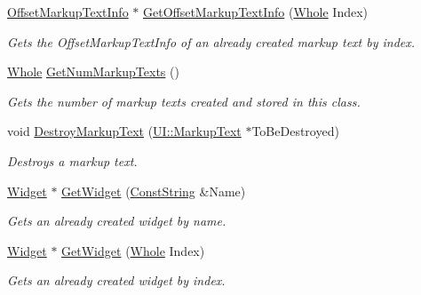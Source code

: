\begin{DoxyCompactItemize}
\hyperlink{structphys_1_1UI_1_1ResizingInfo}{OffsetMarkupTextInfo} $\ast$ \hyperlink{classphys_1_1UI_1_1Window_a05205cbfec7f8824d0d856047307c799}{GetOffsetMarkupTextInfo} (\hyperlink{namespacephys_a460f6bc24c8dd347b05e0366ae34f34a}{Whole} Index)
\begin{DoxyCompactList}\small\item\em Gets the OffsetMarkupTextInfo of an already created markup text by index. \item\end{DoxyCompactList}\item 
\hyperlink{namespacephys_a460f6bc24c8dd347b05e0366ae34f34a}{Whole} \hyperlink{classphys_1_1UI_1_1Window_ac9e23e41ffff8ef475fcdb0c25bad240}{GetNumMarkupTexts} ()
\begin{DoxyCompactList}\small\item\em Gets the number of markup texts created and stored in this class. \item\end{DoxyCompactList}\item 
void \hyperlink{classphys_1_1UI_1_1Window_aba2506738c7cccfbf8297bf03e431cb8}{DestroyMarkupText} (\hyperlink{classphys_1_1UI_1_1MarkupText}{UI::MarkupText} $\ast$ToBeDestroyed)
\begin{DoxyCompactList}\small\item\em Destroys a markup text. \item\end{DoxyCompactList}\item 
\hyperlink{classphys_1_1UI_1_1Widget}{Widget} $\ast$ \hyperlink{classphys_1_1UI_1_1Window_a0d2274afdabda9915d242dc3d057ae61}{GetWidget} (\hyperlink{namespacephys_a5ce5049f8b4bf88d6413c47b504ebb31}{ConstString} \&Name)
\begin{DoxyCompactList}\small\item\em Gets an already created widget by name. \item\end{DoxyCompactList}\item 
\hyperlink{classphys_1_1UI_1_1Widget}{Widget} $\ast$ \hyperlink{classphys_1_1UI_1_1Window_a267f830c09afa7f5455be14c2fc52ecd}{GetWidget} (\hyperlink{namespacephys_a460f6bc24c8dd347b05e0366ae34f34a}{Whole} Index)
\begin{DoxyCompactList}\small\item\em Gets an already created widget by index. \item\end{DoxyCompactList}\item 

\end{DoxyCompactItemize}
